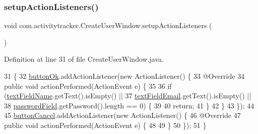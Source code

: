 \subsubsection{\texorpdfstring{setup\+Action\+Listeners()}{setupActionListeners()}}
{\footnotesize\ttfamily void com.\+activitytracker.\+Create\+User\+Window.\+setup\+Action\+Listeners (\begin{DoxyParamCaption}{ }\end{DoxyParamCaption})\hspace{0.3cm}{\ttfamily [private]}}



Definition at line 31 of file Create\+User\+Window.\+java.


\begin{DoxyCode}
31                                         \{
32         \mbox{\hyperlink{classcom_1_1activitytracker_1_1_create_user_window_aa22864c8baa65b46fe9a7621748d7841}{buttonOk}}.addActionListener(\textcolor{keyword}{new} ActionListener() \{
33             @Override
34             \textcolor{keyword}{public} \textcolor{keywordtype}{void} actionPerformed(ActionEvent e) \{
35 
36                 \textcolor{keywordflow}{if} (\mbox{\hyperlink{classcom_1_1activitytracker_1_1_create_user_window_aa2b8cf1781a8a1534dbf5c5b98332c05}{textFieldName}}.getText().isEmpty() ||
37                     \mbox{\hyperlink{classcom_1_1activitytracker_1_1_create_user_window_a4f6010631cb7be5a2ae3691bdca31483}{textFieldEmail}}.getText().isEmpty() ||
38                     \mbox{\hyperlink{classcom_1_1activitytracker_1_1_create_user_window_a29be9c267c003ae90731199d8257dc0a}{passwordField}}.getPassword().length == 0) \{
39 
40                     \textcolor{keywordflow}{return};
41                 \}
42             \}
43         \});
44 
45         \mbox{\hyperlink{classcom_1_1activitytracker_1_1_create_user_window_a975a5cc35d145a3efa4d9e340776ca63}{buttonCancel}}.addActionListener(\textcolor{keyword}{new} ActionListener() \{
46             @Override
47             \textcolor{keyword}{public} \textcolor{keywordtype}{void} actionPerformed(ActionEvent e) \{
48 
49             \}
50         \});
51     \}
\end{DoxyCode}
\mbox{\label{classcom_1_1activitytracker_1_1_create_user_window_a41715d85194c6bb84cf6969f771940dc}} 
